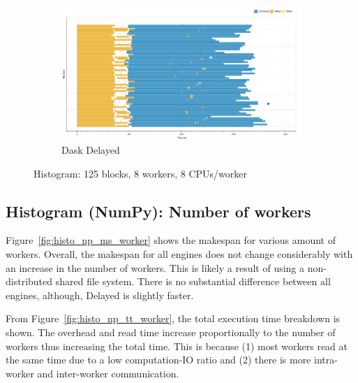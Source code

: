 \documentclass[conference]{IEEEtran}
\begin{document}
\begin{figure}[!t]
\begin{subfigure}[b]{\columnwidth}
        \includegraphics[clip,width=\columnwidth,
        height=0.15\textheight]{images/delayed_histo_gantt.png}%
        \caption{Dask Delayed}\label{fig:histo_dask_delayed_gantt}
    \end{subfigure}
    \caption{Histogram: 125 blocks, 8 workers, 8
    CPUs/worker}\label{fig:histo_gantt}
\end{figure}

\subsection{Histogram (NumPy): Number of workers}
Figure~\ref{fig:histo_np_ms_worker} shows the makespan for various amount of workers.
Overall, the makespan for all engines does not change considerably with an increase
in the number of workers. This is likely a result of using a non-distributed
shared file system. There is no
substantial difference between all engines, although, Delayed is slightly faster.

From Figure~\ref{fig:histo_np_tt_worker}, the total execution time breakdown is
shown. The overhead and read time increase proportionally to the number of
workers thus increasing the total time. This is because (1) most workers read
at the same time due to a low computation-IO ratio and (2) there is more
intra-worker and inter-worker communication.
\end{document}
